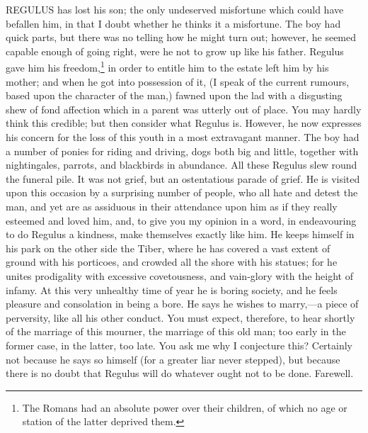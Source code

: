 REGULUS has lost his son; the only undeserved misfortune which could have
befallen him, in that I doubt whether he thinks it a misfortune. The boy
had quick parts, but there was no telling how he might turn out; however,
he seemed capable enough of going right, were he not to grow up like his
father. Regulus gave him his freedom,\footnote{The Romans had an
absolute power over their children, of which no age or station of the
latter deprived them.} in order to entitle him
to the estate left him by his mother; and when he got into possession of
it, (I speak of the current rumours, based upon the character of the man,)
fawned upon the lad with a disgusting shew of fond affection which in a
parent was utterly out of place. You may hardly think this credible; but
then consider what Regulus is. However, he now expresses his concern for
the loss of this youth in a most extravagant manner. The boy had a number
of ponies for riding and driving, dogs both big and little, together with
nightingales, parrots, and blackbirds in abundance. All these Regulus slew
round the funeral pile. It was not grief, but an ostentatious parade of
grief. He is visited upon this occasion by a surprising number of people,
who all hate and detest the man, and yet are as assiduous in their
attendance upon him as if they really esteemed and loved him, and, to give
you my opinion in a word, in endeavouring to do Regulus a kindness, make
themselves exactly like him. He keeps himself in his park on the other
side the Tiber, where he has covered a vast extent of ground with his
porticoes, and crowded all the shore with his statues; for he unites
prodigality with excessive covetousness, and vain-glory with the height of
infamy. At this very unhealthy time of year he is boring society, and he
feels pleasure and consolation in being a bore. He says he wishes to
marry,—a piece of perversity, like all his other conduct. You must
expect, therefore, to hear shortly of the marriage of this mourner, the
marriage of this old man; too early in the former case, in the latter, too
late. You ask me why I conjecture this? Certainly not because he says so
himself (for a greater liar never stepped), but because there is no doubt
that Regulus will do whatever ought not to be done. Farewell.


